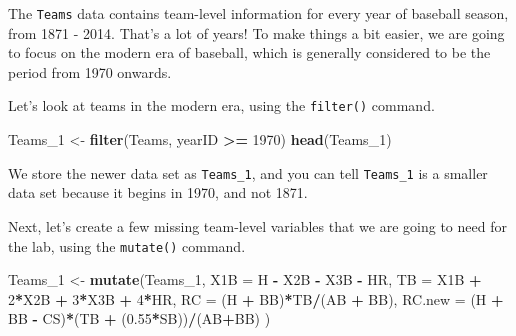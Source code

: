 \documentclass[]{article}
\newenvironment{Shaded}{\begin{snugshade}}{\end{snugshade}}
\newcommand{\DataTypeTok}[1]{\textcolor[rgb]{0.13,0.29,0.53}{#1}}
\newcommand{\DecValTok}[1]{\textcolor[rgb]{0.00,0.00,0.81}{#1}}
\newcommand{\FloatTok}[1]{\textcolor[rgb]{0.00,0.00,0.81}{#1}}
\newcommand{\KeywordTok}[1]{\textcolor[rgb]{0.13,0.29,0.53}{\textbf{#1}}}
\newcommand{\NormalTok}[1]{#1}
\newcommand{\OperatorTok}[1]{\textcolor[rgb]{0.81,0.36,0.00}{\textbf{#1}}}
\newcommand{\StringTok}[1]{\textcolor[rgb]{0.31,0.60,0.02}{#1}}
\begin{document}
The \texttt{Teams} data contains team-level information for every year
of baseball season, from 1871 - 2014. That's a lot of years! To make
things a bit easier, we are going to focus on the modern era of
baseball, which is generally considered to be the period from 1970
onwards.

Let's look at teams in the modern era, using the \texttt{filter()}
command.

\begin{Shaded}
\begin{Highlighting}[]
\NormalTok{Teams_}\DecValTok{1}\NormalTok{ <-}\StringTok{ }\KeywordTok{filter}\NormalTok{(Teams, yearID }\OperatorTok{>=}\StringTok{ }\DecValTok{1970}\NormalTok{)}
\KeywordTok{head}\NormalTok{(Teams_}\DecValTok{1}\NormalTok{)}
\end{Highlighting}
\end{Shaded}

We store the newer data set as \texttt{Teams\_1}, and you can tell
\texttt{Teams\_1} is a smaller data set because it begins in 1970, and
not 1871.

Next, let's create a few missing team-level variables that we are going
to need for the lab, using the \texttt{mutate()} command.

\begin{Shaded}
\begin{Highlighting}[]
\NormalTok{Teams_}\DecValTok{1}\NormalTok{ <-}\StringTok{ }\KeywordTok{mutate}\NormalTok{(Teams_}\DecValTok{1}\NormalTok{, }\DataTypeTok{X1B =}\NormalTok{ H }\OperatorTok{-}\StringTok{ }\NormalTok{X2B }\OperatorTok{-}\StringTok{ }\NormalTok{X3B }\OperatorTok{-}\StringTok{ }\NormalTok{HR, }
                  \DataTypeTok{TB =}\NormalTok{ X1B }\OperatorTok{+}\StringTok{ }\DecValTok{2}\OperatorTok{*}\NormalTok{X2B }\OperatorTok{+}\StringTok{ }\DecValTok{3}\OperatorTok{*}\NormalTok{X3B }\OperatorTok{+}\StringTok{ }\DecValTok{4}\OperatorTok{*}\NormalTok{HR, }
                  \DataTypeTok{RC =}\NormalTok{ (H }\OperatorTok{+}\StringTok{ }\NormalTok{BB)}\OperatorTok{*}\NormalTok{TB}\OperatorTok{/}\NormalTok{(AB }\OperatorTok{+}\StringTok{ }\NormalTok{BB),}
                  \DataTypeTok{RC.new =}\NormalTok{ (H }\OperatorTok{+}\StringTok{ }\NormalTok{BB }\OperatorTok{-}\StringTok{ }\NormalTok{CS)}\OperatorTok{*}\NormalTok{(TB }\OperatorTok{+}\StringTok{ }\NormalTok{(}\FloatTok{0.55}\OperatorTok{*}\NormalTok{SB))}\OperatorTok{/}\NormalTok{(AB}\OperatorTok{+}\NormalTok{BB) )}
\end{Highlighting}
\end{Shaded}
\end{document}
